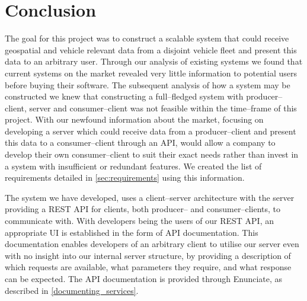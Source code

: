 \chapter{Conclusion}
The goal for this project was to construct a scalable system that could receive geospatial and vehicle relevant data from a disjoint vehicle fleet and present this data to an arbitrary user.
Through our analysis of existing systems we found that current systems on the market revealed very little information to potential users before buying their software.
The subsequent analysis of how a system may be constructed we knew that constructing a full--fledged system with producer--client, server and consumer--client was not feasible within the time--frame of this project.
With our newfound information about the market, focusing on developing a server which could receive data from a producer--client and present this data to a consumer--client through an API, would allow a company to develop their own consumer--client to suit their exact needs rather than invest in a system with insufficient or redundant features.
We created the list of requirements detailed in \cref{sec:requirements} using this information. %

The system we have developed, uses a client--server architecture with the server providing a REST API for clients, both producer-- and consumer--clients, to communicate with.
With developers being the users of our REST API, an appropriate UI is established in the form of API documentation.
This documentation enables developers of an arbitrary client to utilise our server even with no insight into our internal server structure, by providing a description of which requests are available, what parameters they require, and what response can be expected. 
The API documentation is provided through Enunciate, as described in \cref{documenting_services}.

